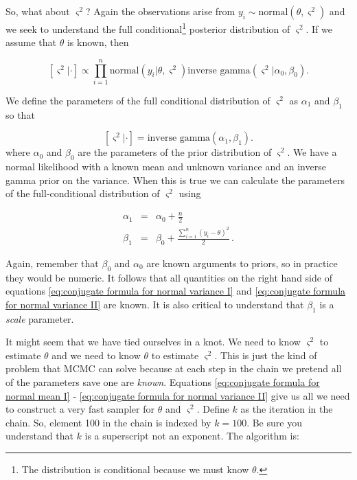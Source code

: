 \documentclass[11pt]{article}
\begin{document}
So, what about $\varsigma^{2}$? Again the observations arise from $y_{i}\sim\text{normal}\left(\theta,\varsigma^{2}\right)$ and we seek to understand the full conditional\footnote{The distribution is conditional because we must know $\theta.$} posterior distribution of $\varsigma^{2}$. If we assume that $\theta$ is known, then 

\begin{equation}
\left[\varsigma^{2}|\cdot\right]\propto\prod_{i=1}^{n}\text{normal}\left(y_{i}|\theta,\varsigma^{2}\right)\text{inverse gamma}\left(\varsigma^{2}|\alpha_{0},\beta_{0}\right).\label{eq:posterior distribution of var sigma}
\end{equation}

We define the parameters of the full conditional distribution of $\varsigma^{2}$ as $\alpha_{1}$ and $\beta_{1}$ so that

\begin{equation}
\left[\varsigma^{2}|\cdot\right]=\text{inverse gamma}\left(\alpha_{1},\beta_{1}\right).
\end{equation}
where $\alpha_0$ and $\beta_0$ are the parameters of the prior distribution of $\varsigma^2$. We have a normal likelihood with a known mean and unknown variance and an inverse gamma prior on the variance. When this is true we can calculate the parameters of the full-conditional distribution of $\varsigma^{2}$ using 

\begin{eqnarray}
\alpha_{1} & = & \alpha_{0}+\frac{n}{2}\label{eq:conjugate formula for normal variance I}\\
\beta_{1} & = & \beta_{0}+\frac{\sum_{i=1}^{n}{(y_{i}-\theta)^{2}}}{2}\,.\label{eq:conjugate formula for normal variance II}
\end{eqnarray}

Again, remember that $\beta_{0}$ and $\alpha_{0}$ are known arguments to priors, so in practice they would be numeric. It follows that all quantities on the right hand side of equations \ref{eq:conjugate formula for normal variance I} and \ref{eq:conjugate formula for normal variance II} are known. It is also critical to understand that $\beta_1$ is a \emph{scale} parameter.

It might seem that we have tied ourselves in a knot. We need to know $\varsigma^{2}$ to estimate $\theta$ and we need to know $\theta$ to estimate $\varsigma^{2}.$ This is just the kind of problem that MCMC can solve because at each step in the chain we pretend all of the parameters save one are \emph{known}. Equations \ref{eq:conjugate formula for normal mean I} - \ref{eq:conjugate formula for normal variance II} give us all we need to construct a very fast sampler for $\theta$ and $\varsigma^{2}$. Define $k$ as the iteration in the chain. So, element 100 in the chain is indexed by $k=100$. Be sure you understand that $k$ is a superscript not an exponent. The algorithm is:
\end{document}
